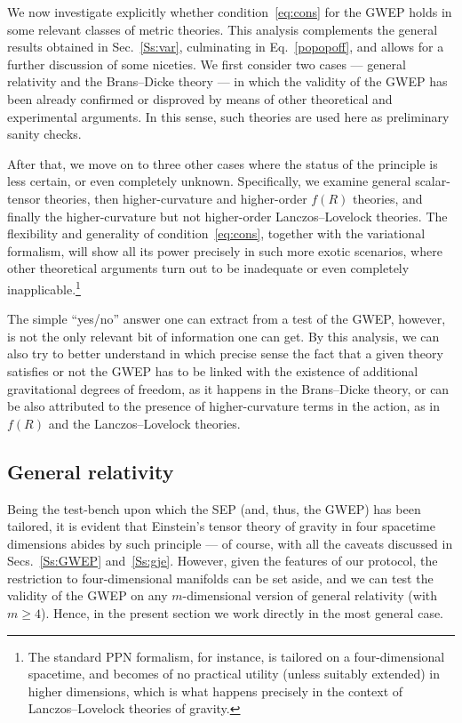 \documentclass[a4paper,showkeys,aps,prd,reprint,nofootinbib,showpacs,twocolumn]{revtex4-1}
\newcommand{\eq}[1]{\( #1 \)}
\theoremstyle{plain}
\begin{document}
We now investigate explicitly whether condition~\eqref{eq:cons} for the GWEP holds in some relevant classes of metric theories.  This analysis complements the general results obtained in Sec.~\ref{Ss:var}, culminating in Eq.~\eqref{popopoff}, and allows for a further discussion of some niceties.  We first consider two cases --- general relativity and the Brans--Dicke theory --- in which the validity of the GWEP has been already confirmed or disproved by means of other theoretical and experimental arguments.  In this sense, such theories are used here as preliminary sanity checks.

After that, we move on to three other cases where the status of the principle is less certain, or even completely unknown.  Specifically, we examine general scalar-tensor theories, then higher-curvature and higher-order \eq{f(R)} theories, and finally the higher-curvature but not higher-order Lanczos--Lovelock theories.  The flexibility and generality of condition~\eqref{eq:cons}, together with the variational formalism, will show all its power precisely in such more exotic scenarios, where other theoretical arguments turn out to be inadequate or even completely inapplicable.\footnote{The standard PPN formalism, for instance, is tailored on a four-dimensional spacetime, and becomes of no practical utility (unless  suitably extended) in higher dimensions, which is what happens precisely in the context of Lanczos--Lovelock theories of gravity.}

The simple ``yes/no'' answer one can extract from a test of the GWEP, however, is not the only relevant bit of information one can get.  By this analysis, we can also try to better understand in which precise sense the fact that a given theory satisfies or not the GWEP has to be linked with the existence of additional gravitational degrees of freedom, as it happens in the Brans--Dicke theory, or can be also attributed to the presence of higher-curvature terms in the action, as in \eq{f(R)} and the Lanczos--Lovelock theories.


\subsection{General relativity}
\label{ss:GR}

Being the test-bench upon which the SEP (and, thus, the GWEP) has been tailored, it is evident that Einstein's tensor theory of gravity in four spacetime dimensions abides by such principle --- of course, with all the caveats discussed in Secs.~\ref{Ss:GWEP} and~\ref{Ss:gje}. However, given the features of our protocol, the restriction to four-dimensional manifolds can be set aside, and we can test the validity of the GWEP on any \eq{m}-dimensional version of general relativity (with \eq{m \ge 4}). Hence, in the present section we work directly in the most general case.
\end{document}
